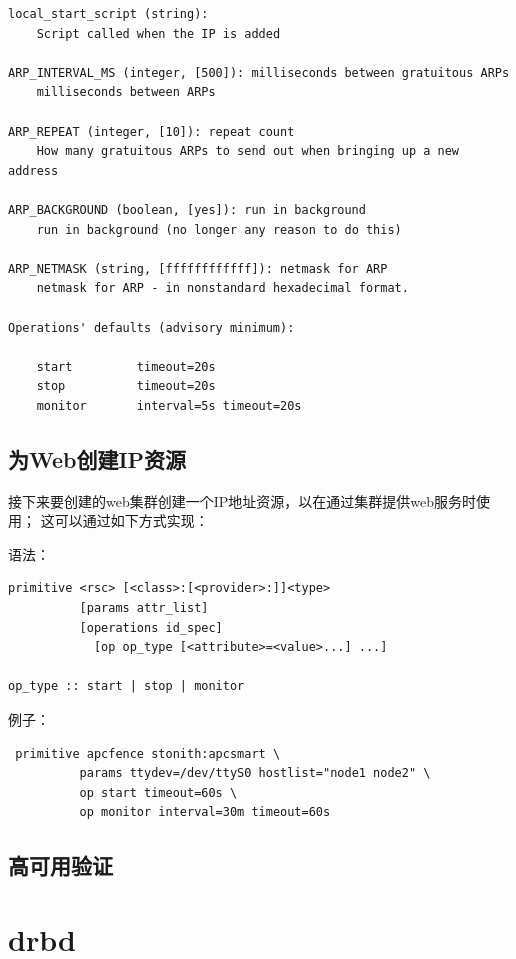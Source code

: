 \begin{verbatim}
local_start_script (string): 
    Script called when the IP is added

ARP_INTERVAL_MS (integer, [500]): milliseconds between gratuitous ARPs
    milliseconds between ARPs

ARP_REPEAT (integer, [10]): repeat count
    How many gratuitous ARPs to send out when bringing up a new address

ARP_BACKGROUND (boolean, [yes]): run in background
    run in background (no longer any reason to do this)

ARP_NETMASK (string, [ffffffffffff]): netmask for ARP
    netmask for ARP - in nonstandard hexadecimal format.

Operations' defaults (advisory minimum):

    start         timeout=20s
    stop          timeout=20s
    monitor       interval=5s timeout=20s
\end{verbatim}

\section{为Web创建IP资源}

接下来要创建的web集群创建一个IP地址资源，以在通过集群提供web服务时使用；
这可以通过如下方式实现：

语法：

\begin{verbatim}
primitive <rsc> [<class>:[<provider>:]]<type>
          [params attr_list]
          [operations id_spec]
            [op op_type [<attribute>=<value>...] ...]

op_type :: start | stop | monitor
\end{verbatim}

例子：

\begin{verbatim}
 primitive apcfence stonith:apcsmart \
          params ttydev=/dev/ttyS0 hostlist="node1 node2" \
          op start timeout=60s \
          op monitor interval=30m timeout=60s
\end{verbatim}


\section{高可用验证}


\chapter{drbd}

